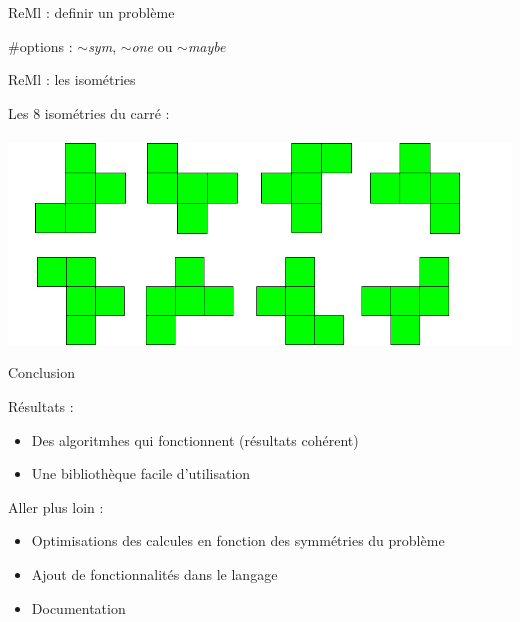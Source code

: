 \documentclass{beamer}
\begin{document}
\begin{frame}{ReMl : definir un problème}



\#options :  
\emph{$\sim$sym}, \emph{$\sim$one} ou \emph{$\sim$maybe}
 
 \end{frame}


\begin{frame}{ReMl : les isométries}

Les 8 isométries du carré : \\
~\\

\includegraphics[scale=0.5]{../imports/transformations.pdf}
\end{frame}




\begin{frame}{Conclusion}

Résultats :  
\begin{itemize}
\item Des algoritmhes qui fonctionnent (résultats cohérent)
\item Une bibliothèque facile d'utilisation
\end{itemize}

 Aller plus loin : 
\begin{itemize}
\item Optimisations des calcules en fonction des symmétries du problème
\item Ajout de fonctionnalités dans le langage
\item Documentation
\end{itemize}



\end{frame}
\end{document}
